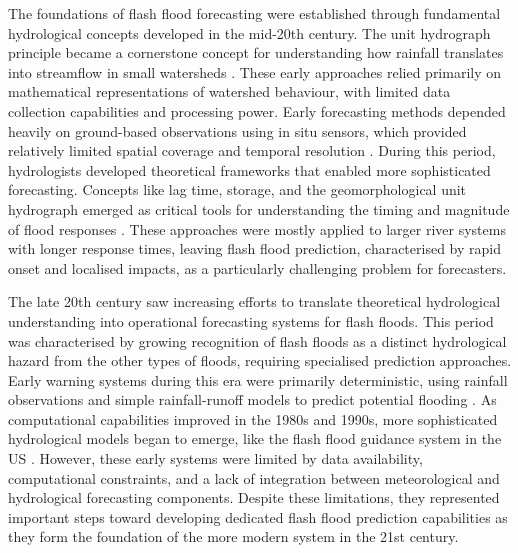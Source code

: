 The foundations of flash flood forecasting were established through fundamental hydrological concepts developed in the mid-20th century. The unit hydrograph principle became a cornerstone concept for understanding how rainfall translates into streamflow in small watersheds \citep{Saharia_2021}. These early approaches relied primarily on mathematical representations of watershed behaviour, with limited data collection capabilities and processing power. Early forecasting methods depended heavily on ground-based observations using in situ sensors, which provided relatively limited spatial coverage and temporal resolution \citep{Tao_2024}. During this period, hydrologists developed theoretical frameworks that enabled more sophisticated forecasting. Concepts like lag time, storage, and the geomorphological unit hydrograph emerged as critical tools for understanding the timing and magnitude of flood responses \citep{Saharia_2021}. These approaches were mostly applied to larger river systems with longer response times, leaving flash flood prediction, characterised by rapid onset and localised impacts, as a particularly challenging problem for forecasters. 

The late 20th century saw increasing efforts to translate theoretical hydrological understanding into operational forecasting systems for flash floods. This period was characterised by growing recognition of flash floods as a distinct hydrological hazard from the other types of floods, requiring specialised prediction approaches. Early warning systems during this era were primarily deterministic, using rainfall observations and simple rainfall-runoff models to predict potential flooding \citep{Hapuarachchi_2011}. As computational capabilities improved in the 1980s and 1990s, more sophisticated hydrological models began to emerge, like the flash flood guidance system in the US \citep{Georgakakos_1986}. However, these early systems were limited by data availability, computational constraints, and a lack of integration between meteorological and hydrological forecasting components. Despite these limitations, they represented important steps toward developing dedicated flash flood prediction capabilities as they form the foundation of the more modern system in the 21st century. 

